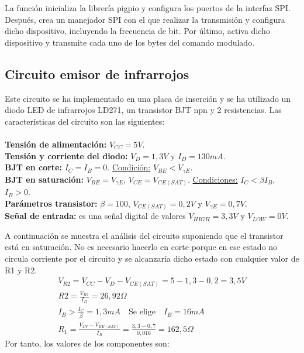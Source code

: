 

	La función inicializa la librería pigpio y configura los puertos de la interfaz SPI. Después, crea un manejador SPI con el que realizar la transmisión y configura dicho dispositivo, incluyendo la frecuencia de bit. Por último, activa dicho dispositivo y transmite cada uno de los bytes del comando modulado. 

\subsection{Circuito emisor de infrarrojos}\label{conversor:circuito}

	Este circuito se ha implementado en una placa de inserción y se ha utilizado un diodo LED de infrarrojos LD271, un transistor BJT npn y 2 resistencias. Las características del circuito son las siguientes:\\ \\
           \textbf{Tensión de alimentación:} $V_{CC}=5V$. \\
	\textbf{Tensión y corriente del diodo:} $V_{D}=1,3V$ y $I_{D}=130mA$. \\
	\textbf{BJT en corte:} $I_{C} = I_{B} = 0$. \underline{Condición:} $V_{BE}<V_{\gamma E}$.\\ 
          \textbf{BJT en saturación:} $V_{BE} = V_{\gamma E}$, $V_{CE} = V_{CE(SAT)}$. \underline{Condiciones:} $I_{C}<\beta I_{B}$, $ I_{B}>0$.\\
           \textbf{Parámetros transistor:} $\beta=100$, $V_{CE(SAT)}=0,2V$ y $V_{\gamma E}=0,7V$. \\
           \textbf{Señal de entrada:} es una señal digital de valores $V_{HIGH}=3,3V$ y $V_{LOW}=0V$.

A continuación se muestra el análisis del circuito suponiendo que el transistor está en saturación. No es necesario hacerlo en corte porque en ese estado no circula corriente por el circuito y se alcanzaría dicho estado con cualquier valor de R1 y R2.
\begin{gather*} 
V_{R2} = V_{CC} - V_{D} - V_{CE(SAT)} = 5 - 1,3 - 0,2 = 3,5 V \\
\boxed{R2 = \frac{V_{R2}}{I_{D}} = 26,92 \Omega }\\ 
I_{B} > \frac{I_{C}}{\beta} = 1,3 mA  \quad \text{Se elige} \quad  I_{B}=16 mA\\
\boxed{R_{1}= \frac{V_{IN}-V_{BE(SAT)}}{I_{B}}=\frac{3,3-0,7}{0,016}=162,5 \Omega}
\end{gather*}
Por tanto, los valores de los componentes son: 

